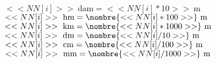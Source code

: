\documentclass[a4paper,11pt,fleqn]{article}
\begin{document}
\begin{multicols}{4}


$<<NN[i]>>~\text{dam}=<<NN[i]*10>>~\text{m}$
$<<NN[i]>>~\text{hm}=\nombre{<<NN[i]*100>>}~\text{m}$
$<<NN[i]>>~\text{km}=\nombre{<<NN[i]*1000>>}~\text{m}$
$<<NN[i]>>~\text{dm}=\nombre{<<NN[i]/10>>}~\text{m}$
$<<NN[i]>>~\text{cm}=\nombre{<<NN[i]/100>>}~\text{m}$
$<<NN[i]>>~\text{mm}=\nombre{<<NN[i]/1000>>}~\text{m}$

	
\end{multicols}
\end{document}
